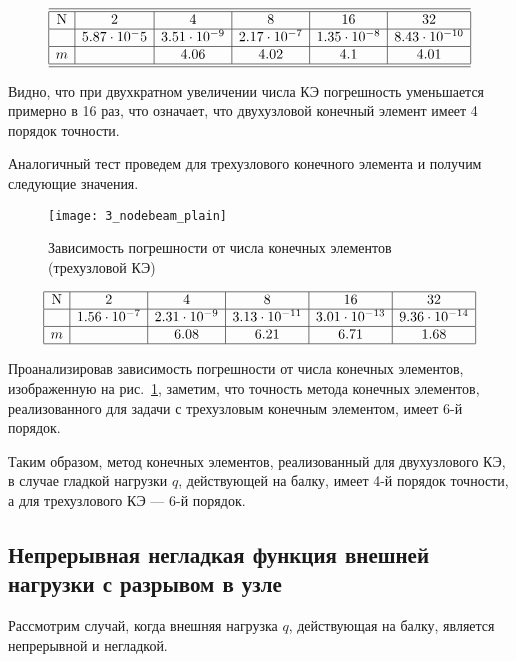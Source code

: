 \documentclass[12pt,a4paper]{article}
\begin{document}
\[
\begin{array}{|c|c|c|c|c|c|}
\hline
\hline
\text{N} & 2 & 4 & 8 & 16 & 32 \\ \hline
\Delta  & 5.87 \cdot 10^-5  & 3.51 \cdot 10^{-9} & 2.17 \cdot 10^{-7} & 1.35 \cdot 10^{-8} & 8.43 \cdot 10^{-10}\\ \hline
m &  & 4.06 & 4.02 & 4.1 & 4.01 \\ 
\hline
\hline
\end{array}
\]

Видно, что при двухкратном увеличении числа КЭ погрешность уменьшается примерно в 16 раз, что означает, что двухузловой конечный элемент имеет 4 порядок точности.

Аналогичный тест проведем для трехузлового конечного элемента и получим следующие значения. 

\begin{figure}[H]
		\centering
		\texttt{[image: 3\_nodebeam\_plain]}
		\caption{Зависимость погрешности от числа конечных элементов (трехузловой КЭ)}
		\label{fig:3_nodebeam_plain}
	\end{figure}
	
\[
\begin{array}{|c|c|c|c|c|c|}
\hline
\text{N} & 2 & 4 & 8 & 16 & 32 \\ \hline
\Delta  & 1.56 \cdot 10^{-7} & 2.31 \cdot 10^{-9} & 3.13 \cdot 10^{-11} & 3.01 \cdot 10^{-13} & 9.36 \cdot 10^{-14} \\ \hline
m &  & 6.08 & 6.21 & 6.71 & 1.68 \\ 
\hline
\end{array}
\]

Проанализировав зависимость погрешности от числа конечных элементов, изображенную на рис.~\ref{fig:3_nodebeam_plain}, заметим, что точность метода конечных элементов, реализованного для задачи с трехузловым конечным элементом, имеет 6-й порядок. 

Таким образом, метод конечных элементов, реализованный для двухузлового КЭ, в случае гладкой нагрузки $q$, действующей на балку, имеет 4-й порядок точности, а для трехузлового КЭ --- 6-й порядок. 



\subsection[Непрерывная негладкая функция внешней нагрузки]{Непрерывная негладкая функция внешней нагрузки с разрывом в узле}

Рассмотрим случай, когда внешняя нагрузка $q$, действующая на балку, является непрерывной и негладкой.
 
\end{document}
